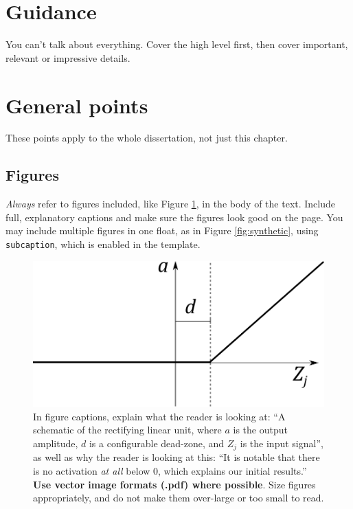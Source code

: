 \documentclass{l4proj}
\begin{document}
\section{Guidance}
You can't talk about everything. Cover the high level first, then cover important, relevant or impressive details.



\section{General points}

These points apply to the whole dissertation, not just this chapter.



\subsection{Figures}
\emph{Always} refer to figures included, like Figure \ref{fig:relu}, in the body of the text. Include full, explanatory captions and make sure the figures look good on the page.
You may include multiple figures in one float, as in Figure \ref{fig:synthetic}, using \texttt{subcaption}, which is enabled in the template.



\begin{figure}
    \centering
    \includegraphics[width=0.5\linewidth]{images/relu.pdf}    

    \caption{In figure captions, explain what the reader is looking at: ``A schematic of the rectifying linear unit, where $a$ is the output amplitude,
    $d$ is a configurable dead-zone, and $Z_j$ is the input signal'', as well as why the reader is looking at this: 
    ``It is notable that there is no activation \emph{at all} below 0, which explains our initial results.'' 
    \textbf{Use vector image formats (.pdf) where possible}. Size figures appropriately, and do not make them over-large or too small to read.
    }

    \label{fig:relu} 
\end{figure}
\end{document}
